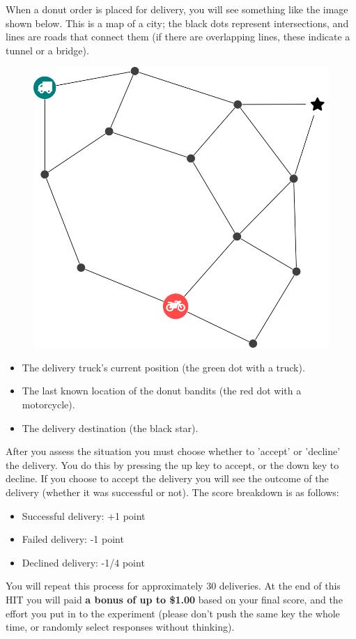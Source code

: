 \begin{quoting}
    When a donut order is placed for delivery, you will see something like the image shown below. This is a map of a city; the black dots represent intersections, and lines are roads that connect them (if there are overlapping lines, these indicate a tunnel or a bridge).

    \begin{figure}[h]
        \centering
        \includegraphics[width=0.4\linewidth]{Figures/transition_vary_1_net_4}
    \end{figure}

    \begin{itemize}
        \item The delivery truck's current position (the green dot with a truck).
        \item The last known location of the donut bandits (the red dot with a motorcycle).
        \item The delivery destination (the black star).
    \end{itemize}

    After you assess the situation you must choose whether to 'accept' or 'decline' the delivery. You do this by pressing the up key to accept, or the down key to decline. If you choose to accept the delivery you will see the outcome of the delivery (whether it was successful or not). The score breakdown is as follows:

    \begin{itemize}
        \item Successful delivery: {\color{blue}+1 point}
        \item Failed delivery: {\color{blue}-1 point}
        \item Declined delivery: {\color{blue}-1/4 point}
    \end{itemize}

    You will repeat this process for approximately 30 deliveries. At the end of this HIT you will paid \textbf{a bonus of up to \$1.00} based on your final score, and the effort you put in to the experiment (please don't push the same key the whole time, or randomly select responses without thinking).
\end{quoting}


